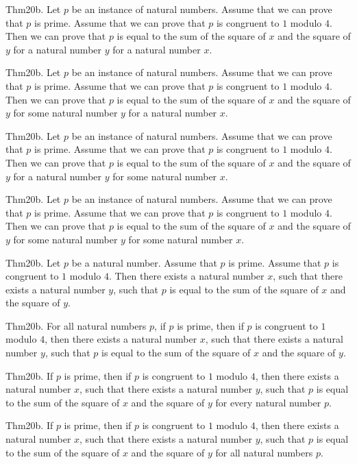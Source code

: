 \documentclass{article}
\begin{document}
Thm20b. Let $p$ be an instance of natural numbers. Assume that we can prove that $p$ is prime. Assume that we can prove that $p$ is congruent to $1$ modulo $4$. Then we can prove that $p$ is equal to the sum of the square of $x$ and the square of $y$ for a natural number $y$ for a natural number $x$.

Thm20b. Let $p$ be an instance of natural numbers. Assume that we can prove that $p$ is prime. Assume that we can prove that $p$ is congruent to $1$ modulo $4$. Then we can prove that $p$ is equal to the sum of the square of $x$ and the square of $y$ for some natural number $y$ for a natural number $x$.

Thm20b. Let $p$ be an instance of natural numbers. Assume that we can prove that $p$ is prime. Assume that we can prove that $p$ is congruent to $1$ modulo $4$. Then we can prove that $p$ is equal to the sum of the square of $x$ and the square of $y$ for a natural number $y$ for some natural number $x$.

Thm20b. Let $p$ be an instance of natural numbers. Assume that we can prove that $p$ is prime. Assume that we can prove that $p$ is congruent to $1$ modulo $4$. Then we can prove that $p$ is equal to the sum of the square of $x$ and the square of $y$ for some natural number $y$ for some natural number $x$.

Thm20b. Let $p$ be a natural number. Assume that $p$ is prime. Assume that $p$ is congruent to $1$ modulo $4$. Then there exists a natural number $x$, such that there exists a natural number $y$, such that $p$ is equal to the sum of the square of $x$ and the square of $y$.

Thm20b. For all natural numbers $p$, if $p$ is prime, then if $p$ is congruent to $1$ modulo $4$, then there exists a natural number $x$, such that there exists a natural number $y$, such that $p$ is equal to the sum of the square of $x$ and the square of $y$.

Thm20b. If $p$ is prime, then if $p$ is congruent to $1$ modulo $4$, then there exists a natural number $x$, such that there exists a natural number $y$, such that $p$ is equal to the sum of the square of $x$ and the square of $y$ for every natural number $p$.

Thm20b. If $p$ is prime, then if $p$ is congruent to $1$ modulo $4$, then there exists a natural number $x$, such that there exists a natural number $y$, such that $p$ is equal to the sum of the square of $x$ and the square of $y$ for all natural numbers $p$.
\end{document}
